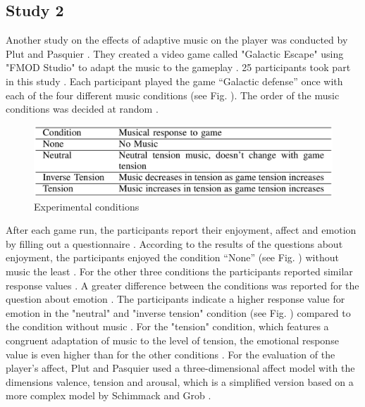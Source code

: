 \subsection{Study 2}
Another study on the effects of adaptive music on the player was conducted by Plut and Pasquier \cite{plut2019music}. They created a video game called "Galactic Escape" using "FMOD Studio" \cite{fmod} to adapt the music to the gameplay \cite{plut2019music}. 25 participants took part in this study \cite{plut2019music}. Each participant played the game “Galactic defense” once with each of the four different music conditions (see Fig. ). The order of the music conditions was decided at random \cite{plut2019music}.
\begin{figure}
    \centering
    \includegraphics[width=1\linewidth]{images/music_matters_table3.png}
    \caption{Experimental conditions \cite{plut2019music}}
    \label{fig:music_matters_table3}
\end{figure}
After each game run, the participants report their enjoyment, affect and emotion by filling out a questionnaire \cite{plut2019music}. 
According to the results of the questions about enjoyment, the participants enjoyed the condition “None” (see Fig. ) without music the least \cite{plut2019music}. For the other three conditions the participants reported similar response values \cite{plut2019music}.
A greater difference between the conditions was reported for the question about emotion \cite{plut2019music}. The participants indicate a higher response value for emotion in the "neutral" and "inverse tension" condition (see Fig. ) compared to the condition without music \cite{plut2019music}. For the "tension" condition, which features a congruent adaptation of music to the level of tension, the emotional response value is even higher than for the other conditions \cite{plut2019music}.
For the evaluation of the player's affect, Plut and Pasquier used a three-dimensional affect model with the dimensions valence, tension and arousal, which is a simplified version based on a more complex model by Schimmack and Grob \cite{schimmack2000dimensional} \cite{plut2019music}.
